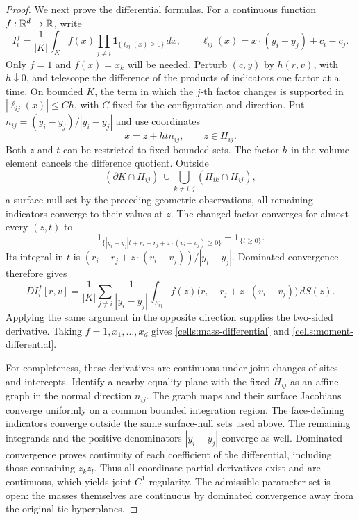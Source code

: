 \begin{proof}
We next prove the differential formulas. For a continuous function
$f:\mathbb R^d\to\mathbb R$, write
\[
 I_i^f=\frac1{|K|}\int_K f(x)
        \prod_{j\ne i}\mathbf1_{\{\ell_{ij}(x)\ge0\}}\,dx,
 \qquad
 \ell_{ij}(x)=x\cdot(y_i-y_j)+c_i-c_j.
\]
Only $f=1$ and $f(x)=x_k$ will be needed. Perturb $(c,y)$ by $h(r,v)$,
with $h\downarrow0$, and telescope the difference of the products of
indicators one factor at a time. On bounded $K$, the term in which the
$j$-th factor changes is supported in
$|\ell_{ij}(x)|\le Ch$, with $C$ fixed for the configuration and direction.
Put $n_{ij}=(y_i-y_j)/|y_i-y_j|$ and use coordinates
\[
 x=z+htn_{ij},\qquad z\in H_{ij}.
\]
Both $z$ and $t$ can be restricted to fixed bounded sets. The factor $h$
in the volume element cancels the difference quotient. Outside
\[
 (\partial K\cap H_{ij})
 \ \cup\!\bigcup_{k\ne i,j}(H_{ik}\cap H_{ij}),
\]
a surface-null set by the preceding geometric observations, all remaining
indicators converge to their values at $z$. The changed factor converges
for almost every $(z,t)$ to
\[
 \mathbf1_{\{|y_i-y_j|t+r_i-r_j+z\cdot(v_i-v_j)\ge0\}}
       -\mathbf1_{\{t\ge0\}}.
\]
Its integral in $t$ is
$(r_i-r_j+z\cdot(v_i-v_j))/|y_i-y_j|$. Dominated convergence therefore gives
\begin{equation}
\label{cells:general-differential}
 D I_i^f[r,v]
 =\frac1{|K|}\sum_{j\ne i}\frac1{|y_i-y_j|}
    \int_{F_{ij}} f(z)
       \bigl(r_i-r_j+z\cdot(v_i-v_j)\bigr)\,dS(z).
\end{equation}
Applying the same argument in the opposite direction supplies the
two-sided derivative. Taking $f=1,x_1,\ldots,x_d$ gives
\eqref{cells:mass-differential} and \eqref{cells:moment-differential}.

For completeness, these derivatives are continuous under joint changes
of sites and intercepts. Identify a nearby equality plane with the fixed
$H_{ij}$ as an affine graph in the normal direction $n_{ij}$. The graph
maps and their surface Jacobians converge uniformly on a common bounded
integration region. The face-defining indicators converge outside the
same surface-null sets used above. The remaining integrands and the
positive denominators $|y_i-y_j|$ converge as well. Dominated convergence
proves continuity of each coefficient of the differential, including
those containing $z_kz_l$. Thus all coordinate partial derivatives exist
and are continuous, which yields joint $C^1$ regularity. The admissible
parameter set is open: the masses themselves are continuous by dominated
convergence away from the original tie hyperplanes.


\end{proof}
